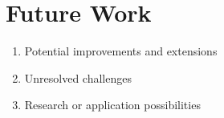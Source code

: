 \section{Future Work}

\begin{enumerate}
    \item Potential improvements and extensions
    \item Unresolved challenges
    \item Research or application possibilities 
\end{enumerate}
